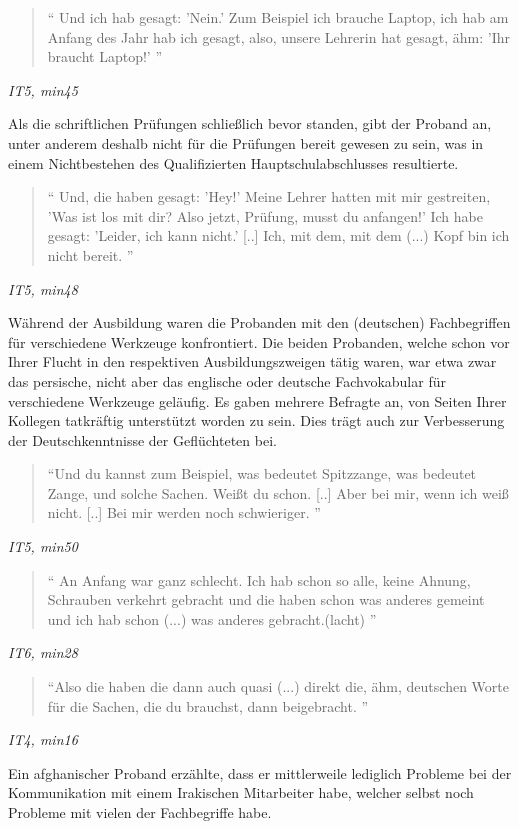\begin{quote}
    `` Und ich hab gesagt: 'Nein.' Zum Beispiel ich brauche Laptop, ich hab am Anfang des Jahr hab ich gesagt, also, unsere Lehrerin hat gesagt, ähm: 'Ihr braucht Laptop!' ''
\end{quote}
\centerline{\textit{IT5, min45}}
Als die schriftlichen Prüfungen schließlich bevor standen, gibt der Proband an, unter anderem deshalb nicht für die Prüfungen bereit gewesen zu sein, was in einem Nichtbestehen des Qualifizierten Hauptschulabschlusses resultierte.
\begin{quote}
    ``  Und, die haben gesagt: 'Hey!' Meine Lehrer hatten mit mir gestreiten, 'Was ist los mit dir? Also jetzt, Prüfung, musst du anfangen!' Ich habe gesagt: 'Leider, ich kann nicht.' [..] Ich, mit dem, mit dem (...) Kopf bin ich nicht bereit. ''
\end{quote}
\centerline{\textit{IT5, min48}}
Während der Ausbildung waren die Probanden mit den (deutschen) Fachbegriffen für verschiedene Werkzeuge konfrontiert. Die beiden Probanden, welche schon vor Ihrer Flucht in den respektiven Ausbildungszweigen tätig waren, war etwa zwar das persische, nicht aber das englische oder deutsche Fachvokabular für verschiedene Werkzeuge geläufig. Es gaben mehrere Befragte an, von Seiten Ihrer Kollegen tatkräftig unterstützt worden zu sein. Dies trägt auch zur Verbesserung der Deutschkenntnisse der Geflüchteten bei.
 
\begin{quote}
    ``Und du kannst zum Beispiel, was bedeutet Spitzzange, was bedeutet Zange, und solche Sachen. Weißt du schon. [..]  Aber bei mir, wenn ich weiß nicht. [..] Bei mir werden noch schwieriger. ''
\end{quote}
\centerline{\textit{IT5, min50}}
\begin{quote}
    `` An Anfang war ganz schlecht. Ich hab schon so alle, keine Ahnung, Schrauben verkehrt gebracht und die haben schon was anderes gemeint und ich hab schon (...) was anderes gebracht.(lacht) ''
\end{quote}
\centerline{\textit{IT6, min28}}
\begin{quote}
    ``Also die haben die dann auch quasi (...) direkt die, ähm, deutschen Worte für die Sachen, die du brauchst, dann beigebracht. ''
\end{quote}
\centerline{\textit{IT4, min16}}

Ein afghanischer Proband erzählte, dass er mittlerweile lediglich Probleme bei der Kommunikation mit einem Irakischen Mitarbeiter habe, welcher selbst noch Probleme mit vielen der Fachbegriffe habe.

